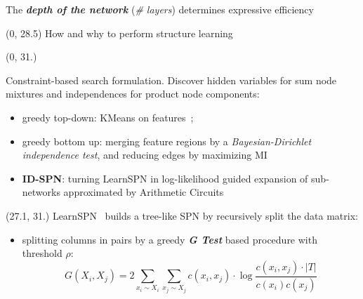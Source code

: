 \documentclass[final]{beamer}
\begin{document}
\begin{frame}{}
\begin{textblock}{25.7}
  The \emph{\textbf{depth of the network}} (\emph{\# layers})
  determines expressive efficiency~\parencite{Martens2014,Zhao2015}

  \end{textblock}
  
  \begin{textblock}{80}(0, 28.5)
    How and why to perform structure learning
    
  \end{textblock}
  
  \begin{textblock}{25.7}(0, 31.)
    \footnotesize
     
    Constraint-based search formulation. Discover hidden variables for sum node mixtures and independences
    for product node components:
    \begin{itemize}
      \itemsep 6pt
    \item greedy top-down: KMeans on features~\emph{\parencite{Dennis2012}};
      
    \item greedy bottom up: merging feature regions by a \emph{Bayesian-Dirichlet independence test},  and reducing edges by maximizing MI\emph{~\parencite{Peharz2013}}

    \item \textbf{ID-SPN}: turning LearnSPN in log-likelihood guided expansion of sub-networks
      approximated by Arithmetic Circuits~\emph{\parencite{Rooshenas2014}}
      
    \end{itemize}
  \end{textblock}
  
  \begin{textblock}{25.7}(27.1, 31.)
    \footnotesize
    LearnSPN~\parencite{Gens2013} builds a tree-like SPN by recursively split the data matrix:

    \begin{itemize}
    \item splitting columns in pairs by a greedy \textbf{\emph{G Test}} based
      procedure with threshold $\rho$:
      \[
      G(X_i, X_j) =  2\sum_{x_i \sim X_i}\sum_{x_j \sim X_j}c(x_i, x_j)\cdot \log\frac{c(x_i, x_j)\cdot |T|}{c(x_i)c(x_j)}
      \]
 
      \end{itemize}
  \end{textblock}
  

\end{frame}
\end{document}
